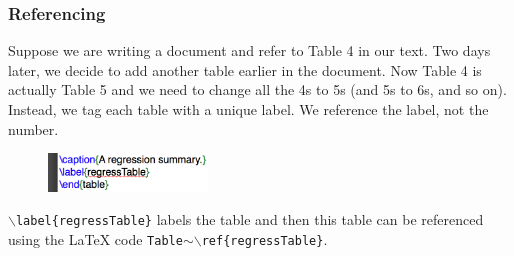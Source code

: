 \documentclass[slidestop,compress,mathserif]{beamer}
\begin{document}
\begin{frame} \frametitle{Referencing}
	Suppose we are writing a document and refer to Table 4 in our text. Two days later, we decide to add another table earlier in the document. Now Table 4 is actually Table 5 and we need to change all the 4s to 5s (and 5s to 6s, and so on).
	\vspace{5mm} \\
	Instead, we tag each table with a unique label. We reference the label, not the number.
	\begin{figure}[htbp]
		\centering
		\includegraphics[height=0.4in]{basicsOfLatex/tabTable/labelTable}
	\end{figure}
	\texttt{\color{command}$\backslash$label}\texttt{\color{braces}\{}\texttt{regressTable}\texttt{\color{braces}\}} labels the table and then this table can be referenced using the LaTeX code \texttt{Table$\sim$}\texttt{\color{command}$\backslash$ref}\texttt{\color{braces}\{}\texttt{regressTable}\texttt{\color{braces}\}}.
\end{frame}
\end{document}
